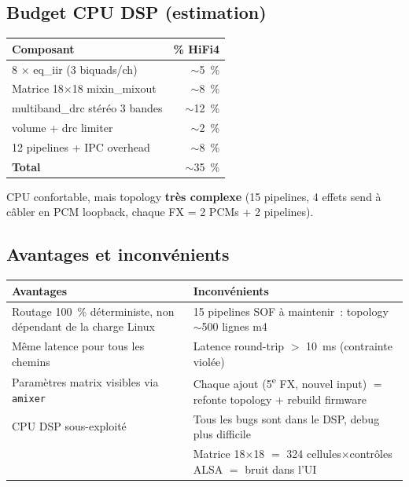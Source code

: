 \documentclass[11pt,a4paper]{article}
\begin{document}
\subsection{Budget CPU DSP (estimation)}
\begin{center}
\begin{tabular}{lr}
\toprule
\textbf{Composant} & \textbf{\% HiFi4} \\
\midrule
8 $\times$ eq\_iir (3 biquads/ch) & $\sim$5~\% \\
Matrice 18$\times$18 mixin\_mixout & $\sim$8~\% \\
multiband\_drc stéréo 3 bandes & $\sim$12~\% \\
volume + drc limiter & $\sim$2~\% \\
12 pipelines + IPC overhead & $\sim$8~\% \\
\midrule
\textbf{Total} & $\sim$35~\% \\
\bottomrule
\end{tabular}
\end{center}
CPU confortable, mais topology \textbf{très complexe} (15 pipelines, 4 effets send à câbler en PCM loopback, chaque FX = 2 PCMs + 2 pipelines).

\subsection{Avantages et inconvénients}
\begin{center}
\begin{tabularx}{\textwidth}{p{} X}
\toprule
\textbf{\textcolor{ca53}{Avantages}} & \textbf{\textcolor{chw}{Inconvénients}} \\
\midrule
Routage 100~\% déterministe, non dépendant de la charge Linux & 15 pipelines SOF à maintenir~: topology $\sim$500 lignes m4 \\
Même latence pour tous les chemins & Latence round-trip $>$ 10~ms (contrainte violée) \\
Paramètres matrix visibles via \texttt{amixer} & Chaque ajout (5\textsuperscript{e} FX, nouvel input) $=$ refonte topology + rebuild firmware \\
CPU DSP sous-exploité & Tous les bugs sont dans le DSP, debug plus difficile \\
& Matrice 18$\times$18 $=$ 324 cellules$\times$contrôles ALSA $=$ bruit dans l'UI \\
\bottomrule
\end{tabularx}
\end{center}
\end{document}
